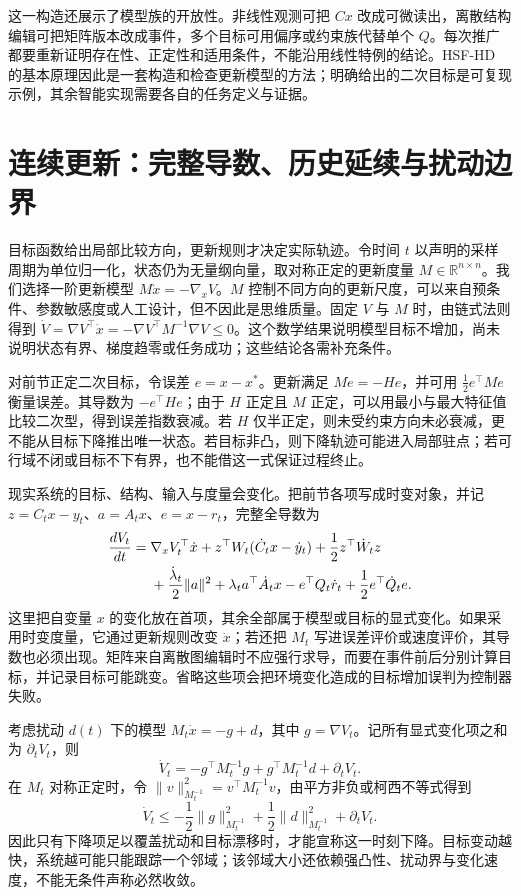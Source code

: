 这一构造还展示了模型族的开放性。非线性观测可把 $Cx$ 改成可微读出，离散结构编辑可把矩阵版本改成事件，多个目标可用偏序或约束族代替单个 $Q$。每次推广都要重新证明存在性、正定性和适用条件，不能沿用线性特例的结论。HSF-HD 的基本原理因此是一套构造和检查更新模型的方法；明确给出的二次目标是可复现示例，其余智能实现需要各自的任务定义与证据。

\section{连续更新：完整导数、历史延续与扰动边界}
\label{sec:state_continuous_update}

目标函数给出局部比较方向，更新规则才决定实际轨迹。令时间 $t$ 以声明的采样周期为单位归一化，状态仍为无量纲向量，取对称正定的更新度量 $M\in\mathbb R^{n\times n}$。我们选择一阶更新模型 $M\dot x=-\nabla_xV$。$M$ 控制不同方向的更新尺度，可以来自预条件、参数敏感度或人工设计，但不因此是思维质量。固定 $V$ 与 $M$ 时，由链式法则得到 $\dot V=\nabla V^\top\dot x=-\nabla V^\top M^{-1}\nabla V\le0$。这个数学结果说明模型目标不增加，尚未说明状态有界、梯度趋零或任务成功；这些结论各需补充条件。

对前节正定二次目标，令误差 $e=x-x^*$。更新满足 $M\dot e=-He$，并可用 $\frac12e^\top Me$ 衡量误差。其导数为 $-e^\top He$；由于 $H$ 正定且 $M$ 正定，可以用最小与最大特征值比较二次型，得到误差指数衰减。若 $H$ 仅半正定，则未受约束方向未必衰减，更不能从目标下降推出唯一状态。若目标非凸，则下降轨迹可能进入局部驻点；若可行域不闭或目标不下有界，也不能借这一式保证过程终止。

现实系统的目标、结构、输入与度量会变化。把前节各项写成时变对象，并记 $z=C_tx-y_t$、$a=A_tx$、$e=x-r_t$，完整全导数为
\begin{align}
 \frac{dV_t}{dt}
 ={}&\nabla_xV_t^\top\dot x
 +z^\top W_t(\dot C_tx-\dot y_t)
 +\frac12 z^\top\dot W_tz \notag\\
 &+\frac{\dot\lambda_t}{2}\|a\|^2
 +\lambda_ta^\top\dot A_tx
 -e^\top Q_t\dot r_t+\frac12e^\top\dot Q_te.
\end{align}
这里把自变量 $x$ 的变化放在首项，其余全部属于模型或目标的显式变化。如果采用时变度量，它通过更新规则改变 $\dot x$；若还把 $M_t$ 写进误差评价或速度评价，其导数也必须出现。矩阵来自离散图编辑时不应强行求导，而要在事件前后分别计算目标，并记录目标可能跳变。省略这些项会把环境变化造成的目标增加误判为控制器失败。

考虑扰动 $d(t)$ 下的模型 $M_t\dot x=-g+d$，其中 $g=\nabla V_t$。记所有显式变化项之和为 $\partial_tV_t$，则
\begin{equation}
 \dot V_t=-g^\top M_t^{-1}g+g^\top M_t^{-1}d+\partial_tV_t.
\end{equation}
在 $M_t$ 对称正定时，令 $\|v\|_{M_t^{-1}}^2=v^\top M_t^{-1}v$，由平方非负或柯西不等式得到
\begin{equation}
 \dot V_t\le-\frac12\|g\|_{M_t^{-1}}^2
 +\frac12\|d\|_{M_t^{-1}}^2+\partial_tV_t.
\end{equation}
因此只有下降项足以覆盖扰动和目标漂移时，才能宣称这一时刻下降。目标变动越快，系统越可能只能跟踪一个邻域；该邻域大小还依赖强凸性、扰动界与变化速度，不能无条件声称必然收敛。


